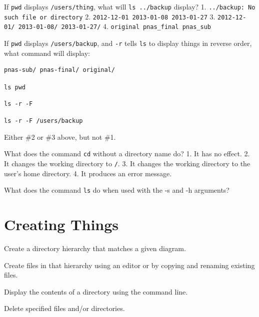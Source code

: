 \documentclass{book}
\begin{document}
\begin{challenge}

  If \texttt{pwd} displays \texttt{/users/thing}, what will
  \texttt{ls ../backup} display? 1.
  \texttt{../backup: No such file or directory} 2.
  \texttt{2012-12-01 2013-01-08 2013-01-27} 3.
  \texttt{2012-12-01/ 2013-01-08/ 2013-01-27/} 4.
  \texttt{original pnas\_final pnas\_sub}

\end{challenge}

\begin{challenge}

  If \texttt{pwd} displays \texttt{/users/backup}, and \texttt{-r} tells
  \texttt{ls} to display things in reverse order, what command will
  display:

\begin{verbatim}
pnas-sub/ pnas-final/ original/
\end{verbatim}

\begin{swcenumerate}
\item
  \texttt{ls pwd}
\item
  \texttt{ls -r -F}
\item
  \texttt{ls -r -F /users/backup}
\item
  Either \#2 or \#3 above, but not \#1.
\end{swcenumerate}

\end{challenge}

\begin{challenge}

  What does the command \texttt{cd} without a directory name do? 1. It has
  no effect. 2. It changes the working directory to \texttt{/}. 3. It
  changes the working directory to the user's home directory. 4. It
  produces an error message.

\end{challenge}

\begin{challenge}

  What does the command \texttt{ls} do when used with the -s and -h
  arguments?

\end{challenge}

\section{Creating Things}

\begin{objectives}
\begin{swcitemize}
\item
  Create a directory hierarchy that matches a given diagram.
\item
  Create files in that hierarchy using an editor or by copying and
  renaming existing files.
\item
  Display the contents of a directory using the command line.
\item
  Delete specified files and/or directories.
\end{swcitemize}
\end{objectives}
\end{document}
